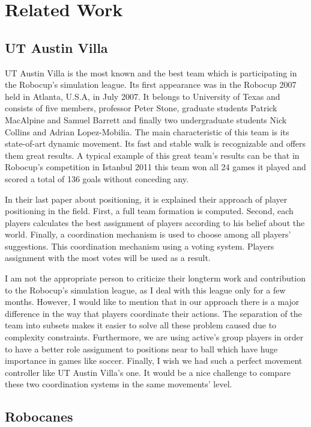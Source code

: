 \chapter{Related Work}
\label{related}

\section{UT Austin Villa}\cite{UTAustinVillaRobotSoccerTeam}
UT Austin Villa is the most known and the best team which is participating in the Robocup's simulation league. Its first appearance was in the Robocup 2007 held in Atlanta, U.S.A, in July 2007. It belongs to University of Texas and consists of five members, professor Peter Stone, 
graduate students Patrick MacAlpine and Samuel Barrett and finally two undergraduate students Nick Collins and Adrian Lopez-Mobilia. The main characteristic of this team is its state-of-art dynamic movement. Its fast and stable walk is recognizable and offers them great results. A typical example of this great team's results can be that in Robocup's competition in Istanbul 2011 this team won all 24 games it played and scored a total of 136 goals without conceding any.

In their last paper \cite{UtAustinVillaPaper} about positioning, it is explained their approach of player positioning in the field. First, a full team formation is computed. Second, each players calculates the best assignment of players according to his belief about the world. Finally, a coordination mechanism is used to choose among all players' suggestions. This coordination mechanism using a voting system. Players assignment with the most votes will be used as a result.

I am not the appropriate person to criticize their longterm work and contribution to the Robocup's simulation league, as I deal with this league only for a few months. However, I would like to mention that in our approach there is a major difference in the way that players coordinate their actions. The separation of the team into subsets makes it easier to solve all these problem caused due to complexity constraints. Furthermore, we are using active's group players in order to have a better role assignment to positions near to ball which have huge importance in games like soccer. Finally, I wish we had such a perfect movement controller like UT Austin Villa's one. It would be a nice challenge to compare these two coordination systems in the same movements' level.

\section{Robocanes}

